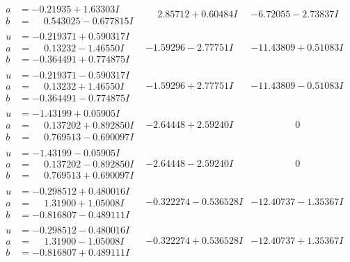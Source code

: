 \documentclass[1p]{elsarticle_modified}
\theoremstyle{definition}
\begin{document}
$$\begin{array}{c|c|c}
\begin{aligned}
a &= -0.21935 + 1.63303 I \\
b &= \phantom{-}0.543025 - 0.677815 I\end{aligned}
 & \phantom{-}2.85712 + 0.60484 I & -6.72055 - 2.73837 I \\ \hline\begin{aligned}
u &= -0.219371 + 0.590317 I \\
a &= \phantom{-}0.13232 - 1.46550 I \\
b &= -0.364491 + 0.774875 I\end{aligned}
 & -1.59296 - 2.77751 I & -11.43809 + 0.51083 I \\ \hline\begin{aligned}
u &= -0.219371 - 0.590317 I \\
a &= \phantom{-}0.13232 + 1.46550 I \\
b &= -0.364491 - 0.774875 I\end{aligned}
 & -1.59296 + 2.77751 I & -11.43809 - 0.51083 I \\ \hline\begin{aligned}
u &= -1.43199 + 0.05905 I \\
a &= \phantom{-}0.137202 + 0.892850 I \\
b &= \phantom{-}0.769513 - 0.690097 I\end{aligned}
 & -2.64448 + 2.59240 I & \phantom{-0.000000 } 0 \\ \hline\begin{aligned}
u &= -1.43199 - 0.05905 I \\
a &= \phantom{-}0.137202 - 0.892850 I \\
b &= \phantom{-}0.769513 + 0.690097 I\end{aligned}
 & -2.64448 - 2.59240 I & \phantom{-0.000000 } 0 \\ \hline\begin{aligned}
u &= -0.298512 + 0.480016 I \\
a &= \phantom{-}1.31900 + 1.05008 I \\
b &= -0.816807 - 0.489111 I\end{aligned}
 & -0.322274 - 0.536528 I & -12.40737 - 1.35367 I \\ \hline\begin{aligned}
u &= -0.298512 - 0.480016 I \\
a &= \phantom{-}1.31900 - 1.05008 I \\
b &= -0.816807 + 0.489111 I\end{aligned}
 & -0.322274 + 0.536528 I & -12.40737 + 1.35367 I \\ \hline\begin{aligned}

\end{aligned}
\end{array}$$
\end{document}

